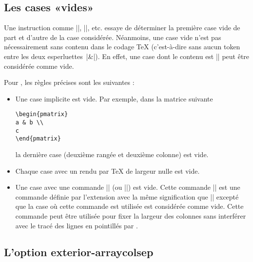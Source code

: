 \documentclass[dvipsnames]{article}%
\def\interitem{\vspace{7mm plus 2 mm minus 3mm}}
\begin{document}
\subsection{Les cases «vides»}

\label{empty-cells}
Une instruction comme |\Ldots|, |\Cdots|, etc. essaye de déterminer la première
case vide de part et d'autre de la case considérée. Néanmoins, une case vide
n'est pas nécessairement sans contenu dans le codage TeX (c'est-à-dire sans
aucun token entre les deux esperluettes~|&|). En effet, une case dont le contenu
est |\hspace*{1cm}| peut être considérée comme vide.

\interitem
Pour , les règles précises sont les suivantes :

\begin{itemize}
\item Une case implicite est vide. Par exemple, dans la matrice suivante

\begin{Verbatim}
\begin{pmatrix}
a & b \\
c 
\end{pmatrix}
\end{Verbatim}

la dernière case (deuxième rangée et deuxième colonne) est vide.

\medskip
\item Chaque case avec un rendu par TeX de largeur nulle est vide.

\medskip
\item Une case avec une commande |\Hspace| (ou |\Hspace*|) est vide. Cette
commande |\Hspace| est une commande définie par l'extension 
avec la même signification que |\hspace| excepté que la case où cette commande
est utilisée est considérée comme vide. Cette commande peut être utilisée pour
fixer la largeur des colonnes sans interférer avec le tracé des lignes en
pointillés par .

\end{itemize}


\subsection{L'option exterior-arraycolsep}
\end{document}
